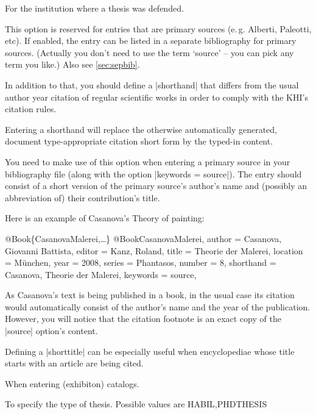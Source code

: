 \documentclass[a4paper,
10pt,
ngerman,
english
]{ltxdoc}
\begin{document}
For the institution where a thesis was defended.

\label{sec:source}
This option is reserved for entries that are primary sources (e.\,g. Alberti, Paleotti, etc). %
If enabled, the entry can be listed in a separate bibliography for primary sources. (Actually you don't need to use the term \enquote*{source} -- you can pick any term you like.) Also see \cref{sec:sepbib}.

In addition to that, you should define a |shorthand| that differs from the usual author year citation of regular scientific works in order to comply with the KHI's citation rules.

\label{sec:shorthand}
Entering a shorthand will replace the otherwise automatically generated, document type-appropriate citation short form by the typed-in content.

You need to make use of this option when entering a primary source in your bibliography file (along with the option |keywords = source|). The entry should consist of a short version of the primary source's author's name and (possibly an abbreviation of) their contribution's title.

Here is an example of Casanova's Theory of painting:
\begin{bibexample}[label=CasanovaMalerei]{{@}Book\{CasanovaMalerei,…\}}
@Book{CasanovaMalerei,
  author    = {Casanova, Giovanni Battista},
  editor    = {Kanz, Roland},
  title     = {Theorie der Malerei},
  location  = {München},
  year      = {2008},
  series    = {Phantasos},
  number    = {8},
  shorthand = {Casanova, Theorie der Malerei},
  keywords  = {source},
}
\end{bibexample}
As Casanova's text is being published in a book, in the usual case its citation would automatically consist of the author's name and the year of the publication.
However, you will notice that the citation footnote is an exact copy of the |source| option's content.

Defining a |shorttitle| can be especially useful when encyclopediae whose title starts with an article are being cited.

When entering (exhibiton) catalogs.

To specify the type of thesis. Possible values are HABIL,PHDTHESIS
\end{document}
